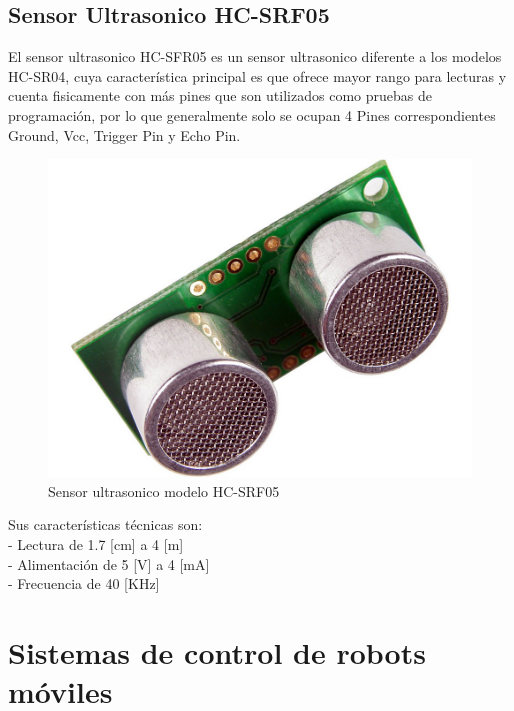 \documentclass[12pt]{book} %
\begin{document}
\subsection{Sensor Ultrasonico HC-SRF05}
El sensor ultrasonico HC-SFR05 es un sensor ultrasonico diferente a los modelos HC-SR04, cuya característica principal es que ofrece mayor rango para lecturas y cuenta fisicamente con más pines que son utilizados como pruebas de programación, por lo que generalmente solo se ocupan 4 Pines correspondientes Ground, Vcc, Trigger Pin y Echo Pin.
\begin{figure}[H]
	\begin{center}
	\includegraphics[scale=0.3]{SR.jpg}
	\caption{Sensor ultrasonico modelo HC-SRF05} 
	\end{center}
	\end{figure}
Sus características técnicas son:\\
- Lectura de 1.7 [cm] a 4 [m]\\
- Alimentación de 5 [V] a 4 [mA]\\
- Frecuencia de 40 [KHz]\\

	\section{Sistemas de control de robots móviles}
\end{document}
